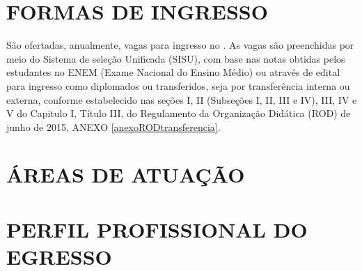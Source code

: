\documentclass{paper}
\begin{document}

\if{}
    
\else
    
\fi


\clearpage
\thispagestyle{empty}
\section{FORMAS DE INGRESSO}


São ofertadas, anualmente, \NUMVAGAS vagas para ingresso no \NOMECURSO. As vagas são preenchidas por meio do Sistema de seleção Unificada (SISU), com base nas notas obtidas pelos estudantes no ENEM (Exame Nacional do Ensino Médio) ou através de edital para ingresso como diplomados ou transferidos, seja por transferência interna ou externa, conforme estabelecido nas seções I, II (Subseções I, II, III e IV), III, IV e V do Capitulo I, Título III, do Regulamento da Organização Didática (ROD) de junho de 2015, ANEXO \ref{anexoRODtransferencia}.


\clearpage\section{ÁREAS DE ATUAÇÃO}

\if{}
    
\else
    
\fi


\clearpage\section{PERFIL PROFISSIONAL DO EGRESSO}

\if{}
    
\else
    
\fi

\end{document}
